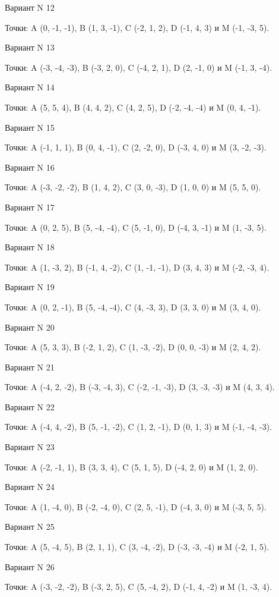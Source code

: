 \documentclass[11pt]{report}
\begin{document}
Вариант N 12

Точки: A (0, -1, -1), B (1, 3, -1), C (-2, 1, 2), D (-1, 4, 3) и M (-1, -3, 5).
\newpage

Вариант N 13

Точки: A (-3, -4, -3), B (-3, 2, 0), C (-4, 2, 1), D (2, -1, 0) и M (-1, 3, -4).

Вариант N 14

Точки: A (5, 5, 4), B (4, 4, 2), C (4, 2, 5), D (-2, -4, -4) и M (0, 4, -1).

Вариант N 15

Точки: A (-1, 1, 1), B (0, 4, -1), C (2, -2, 0), D (-3, 4, 0) и M (3, -2, -3).

Вариант N 16

Точки: A (-3, -2, -2), B (1, 4, 2), C (3, 0, -3), D (1, 0, 0) и M (5, 5, 0).

Вариант N 17

Точки: A (0, 2, 5), B (5, -4, -4), C (5, -1, 0), D (-4, 3, -1) и M (1, -3, 5).

Вариант N 18

Точки: A (1, -3, 2), B (-1, 4, -2), C (1, -1, -1), D (3, 4, 3) и M (-2, -3, 4).

Вариант N 19

Точки: A (0, 2, -1), B (5, -4, -4), C (4, -3, 3), D (3, 3, 0) и M (3, 4, 0).

Вариант N 20

Точки: A (5, 3, 3), B (-2, 1, 2), C (1, -3, -2), D (0, 0, -3) и M (2, 4, 2).

Вариант N 21

Точки: A (-4, 2, -2), B (-3, -4, 3), C (-2, -1, -3), D (3, -3, -3) и M (4, 3, 4).

Вариант N 22

Точки: A (-4, 4, -2), B (5, -1, -2), C (1, 2, -1), D (0, 1, 3) и M (-1, -4, -3).

Вариант N 23

Точки: A (-2, -1, 1), B (3, 3, 4), C (5, 1, 5), D (-4, 2, 0) и M (1, 2, 0).

Вариант N 24

Точки: A (1, -4, 0), B (-2, -4, 0), C (2, 5, -1), D (-4, 3, 0) и M (-3, 5, 5).

Вариант N 25

Точки: A (5, -4, 5), B (2, 1, 1), C (3, -4, -2), D (-3, -3, -4) и M (-2, 1, 5).

Вариант N 26

Точки: A (-3, -2, -2), B (-3, 2, 5), C (5, -4, 2), D (-1, 4, -2) и M (1, -3, 4).
\end{document}
